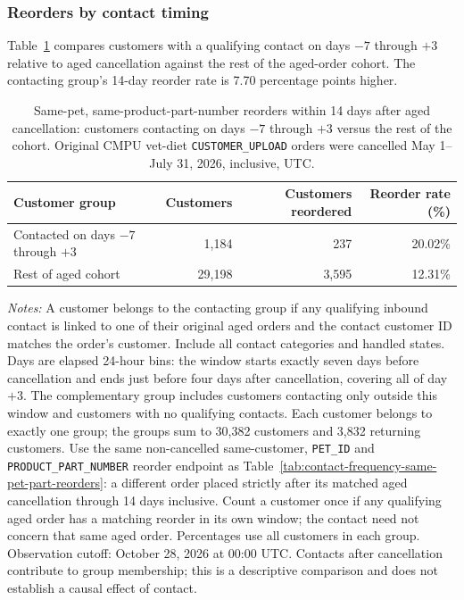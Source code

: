 \clearpage
\subsubsection{Reorders by contact timing}
Table~\ref{tab:contact-window-same-pet-part-reorders} compares customers with a
qualifying contact on days $-7$ through $+3$ relative to aged cancellation
against the rest of the aged-order cohort. The contacting group's 14-day reorder
rate is 7.70 percentage points higher.

\begin{table}[!htbp]
\centering
\caption{Same-pet, same-product-part-number reorders within 14 days after aged cancellation: customers contacting on days $-7$ through $+3$ versus the rest of the cohort. Original CMPU vet-diet \texttt{CUSTOMER\_UPLOAD} orders were cancelled May 1--July 31, 2026, inclusive, UTC.}
\label{tab:contact-window-same-pet-part-reorders}
\begin{tabular}{@{}lrrr@{}}
\toprule
Customer group & Customers & Customers reordered & Reorder rate (\%) \\
\midrule
Contacted on days $-7$ through $+3$ & 1,184 & 237 & 20.02\% \\
Rest of aged cohort & 29,198 & 3,595 & 12.31\% \\
\bottomrule
\end{tabular}

\begin{minipage}{\linewidth}
\footnotesize
\textit{Notes:} A customer belongs to the contacting group if any qualifying
inbound contact is linked to one of their original aged orders and the contact
customer ID matches the order's customer. Include all contact categories and
handled states. Days are elapsed 24-hour bins: the window starts exactly seven
days before cancellation and ends just before four days after cancellation,
covering all of day $+3$. The complementary group includes customers contacting
only outside this window and customers with no qualifying contacts. Each
customer belongs to exactly one group; the groups sum to 30,382 customers and
3,832 returning customers. Use the same non-cancelled same-customer,
\texttt{PET\_ID} and \texttt{PRODUCT\_PART\_NUMBER} reorder endpoint as
Table~\ref{tab:contact-frequency-same-pet-part-reorders}: a different order
placed strictly after its matched aged cancellation through 14 days inclusive.
Count a customer once if any qualifying aged order has a matching reorder in
its own window; the contact need not concern that same aged order. Percentages
use all customers in each group. Observation cutoff: October 28, 2026 at 00:00
UTC. Contacts after cancellation contribute to group membership; this is a
descriptive comparison and does not establish a causal effect of contact.
\end{minipage}
\end{table}
